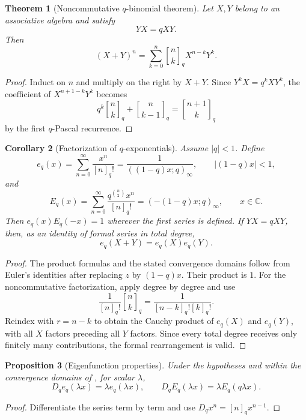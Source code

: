 \documentclass[11pt,oneside,openany]{book}
\newtheorem{theorem}{Theorem}[chapter]
\newtheorem{proposition}[theorem]{Proposition}
\newtheorem{corollary}[theorem]{Corollary}
\theoremstyle{definition}
\theoremstyle{remark}
\newcommand{\qbinom}[2]{\genfrac{[}{]}{0pt}{}{#1}{#2}_{q}}
\newcommand{\C}{\mathbb C}
\newcommand{\abs}[1]{\lvert #1\rvert}
\begin{document}
\begin{theorem}[Noncommutative $q$-binomial theorem]\label{thm:quantum-binomial}
Let $X,Y$ belong to an associative algebra and satisfy
\[
 YX=qXY.
\]
Then
\[
 (X+Y)^n=\sum_{k=0}^{n}\qbinom nkX^{n-k}Y^k.
\]
\end{theorem}

\begin{proof}
Induct on $n$ and multiply on the right by $X+Y$.  Since $Y^kX=q^kXY^k$, the coefficient of $X^{n+1-k}Y^k$ becomes
\[
 q^k\qbinom nk+\qbinom n{k-1}=\qbinom{n+1}k
\]
by the first $q$-Pascal recurrence.
\end{proof}

\begin{corollary}[Factorization of $q$-exponentials]\label{cor:qexp-factor}
Assume $\abs q<1$.  Define
\[
 e_q(x)=\sum_{n=0}^{\infty}\frac{x^n}{[n]_q!}
 =\frac1{((1-q)x;q)_\infty},
 \qquad \abs{(1-q)x}<1,
\]
and
\[
 E_q(x)=\sum_{n=0}^{\infty}\frac{q^{\binom n2}x^n}{[n]_q!}
 =(-(1-q)x;q)_\infty,
 \qquad x\in\C.
\]
Then $e_q(x)E_q(-x)=1$ wherever the first series is defined.  If $YX=qXY$, then, as an identity of formal series in total degree,
\[
 e_q(X+Y)=e_q(X)e_q(Y).
\]
\end{corollary}

\begin{proof}
The product formulas and the stated convergence domains follow from Euler's identities after replacing $z$ by $(1-q)x$.  Their product is $1$.  For the noncommutative factorization, apply  degree by degree and use
\[
 \frac1{[n]_q!}\qbinom nk
 =\frac1{[n-k]_q![k]_q!}.
\]
Reindex with $r=n-k$ to obtain the Cauchy product of $e_q(X)$ and $e_q(Y)$, with all $X$ factors preceding all $Y$ factors.  Since every total degree receives only finitely many contributions, the formal rearrangement is valid.
\end{proof}

\begin{proposition}[Eigenfunction properties]\label{prop:qexp-eigen}
Under the hypotheses and within the convergence domains of , for scalar $\lambda$,
\[
 D_qe_q(\lambda x)=\lambda e_q(\lambda x),
 \qquad
 D_qE_q(\lambda x)=\lambda E_q(q\lambda x).
\]
\end{proposition}

\begin{proof}
Differentiate the series term by term and use $D_qx^n=[n]_qx^{n-1}$.
\end{proof}
\end{document}
